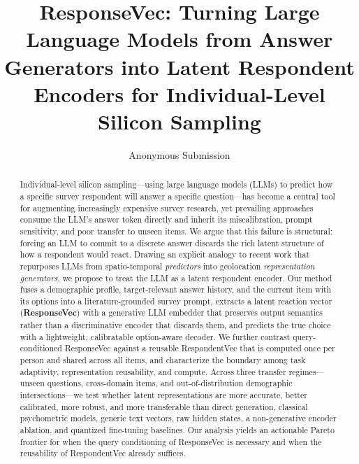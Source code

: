 \documentclass[letterpaper]{article} %
\title{ResponseVec: Turning Large Language Models from Answer Generators into Latent Respondent Encoders for Individual-Level Silicon Sampling}
\author{
    Anonymous Submission
}
\begin{document}
\maketitle

\begin{abstract}
Individual-level silicon sampling---using large language models (LLMs) to predict how a specific survey respondent will answer a specific question---has become a central tool for augmenting increasingly expensive survey research, yet prevailing approaches consume the LLM's answer token directly and inherit its miscalibration, prompt sensitivity, and poor transfer to unseen items. We argue that this failure is structural: forcing an LLM to commit to a discrete answer discards the rich latent structure of how a respondent would react. Drawing an explicit analogy to recent work that repurposes LLMs from spatio-temporal \emph{predictors} into geolocation \emph{representation generators}, we propose to treat the LLM as a latent respondent encoder. Our method fuses a demographic profile, target-relevant answer history, and the current item with its options into a literature-grounded survey prompt, extracts a latent reaction vector (\textbf{ResponseVec}) with a generative LLM embedder that preserves output semantics rather than a discriminative encoder that discards them, and predicts the true choice with a lightweight, calibratable option-aware decoder. We further contrast query-conditioned ResponseVec against a reusable RespondentVec that is computed once per person and shared across all items, and characterize the boundary among task adaptivity, representation reusability, and compute. Across three transfer regimes---unseen questions, cross-domain items, and out-of-distribution demographic intersections---we test whether latent representations are more accurate, better calibrated, more robust, and more transferable than direct generation, classical psychometric models, generic text vectors, raw hidden states, a non-generative encoder ablation, and quantized fine-tuning baselines. Our analysis yields an actionable Pareto frontier for when the query conditioning of ResponseVec is necessary and when the reusability of RespondentVec already suffices.
\end{abstract}












\end{document}
